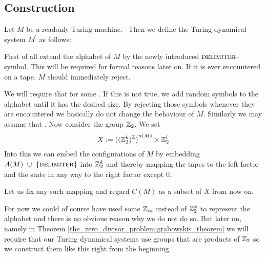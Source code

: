 \subsection{Construction}
\label{tm_to_tds:construction}

Let $M$ be a readonly Turing machine.\footnotemark~
Then we define the Turing dynamical system $M^\prime$ as follows:

First of all extend the alphabet of $M$ by the newly introduced $\text{\scshape{delimiter}}$-symbol. This will be required for formal reasons later on. If it is ever encountered on a tape, $M$ should immediately reject.

We will require that  for some .
If this is not true, we add random symbols to the alphabet until it has the desired size. By rejecting those symbols whenever they are encountered we basically do not change the behaviour of $M$.
Similarly we may assume that .
Now consider the group $\mathbb{Z}_2$.
We set
\begin{align*}
	X := {{((\mathbb{Z}_2^{k})^{\mathbb{Z}})}^{n(M)}} \times \mathbb{Z}_2^l
\end{align*}
Into this we can embed the configurations of $M$ by embedding $A(M)~\cup~\{\text{\scshape{delimiter}}\}$ into $\mathbb{Z}_2^k$ and thereby mapping the tapes to the left factor and the state in any way to the right factor except $0$.

Let us fix any such mapping and regard $C(M)$ as a subset of $X$ from now on.

\begin{Remark}
	For now we could of course have used some $\mathbb{Z}_m$ instead of $\mathbb{Z}_2^k$ to represent the alphabet and there is no obvious reason why we do not do so.
	But later on, namely in Theorem \ref{the_zero_divisor_problem:grabowskis_theorem} we will require that our Turing dynamical systems use groups that are products of $\mathbb{Z}_2$ so we construct them like this right from the beginning.
\end{Remark}

